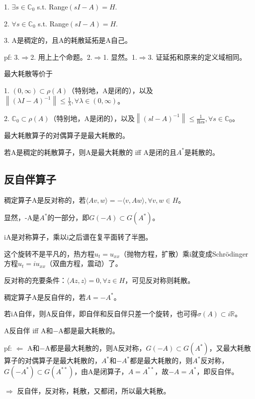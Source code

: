 1. $\exists s \in \mathbb{C}_0$ s.t. Range$(sI - A) = H$.

2. $\forall s \in \mathbb{C}_0$ s.t. Range$(sI - A) = H$.

3. A是稠定的，且A的耗散延拓是A自己。

pf: 3.$\Rightarrow$2. 用上上个命题。2.$\Rightarrow$1. 显然。1.$\Rightarrow$3. 证延拓和原来的定义域相同。

最大耗散等价于

1. $(0, \infty) \subset \rho(A)$（特别地，A是闭的），以及$\left\|(\lambda I-A)^{-1}\right\| \leq \frac{1}{\lambda}, \forall \lambda \in(0, \infty)$。

2. $\mathbb{C}_{0} \subset \rho(A)$（特别地，A是闭的），以及$\left\|(s l-A)^{-1}\right\| \leq \frac{1}{\operatorname{Res}}, \forall s \in \mathbb{C}_{0}$。

最大耗散算子的对偶算子是最大耗散的。

若A是稠定的耗散算子，则A是最大耗散的 iff A是闭的且$A^{\ast}$是耗散的。

\subsection{反自伴算子}

稠定算子A是反对称的，若$\langle Av, w \rangle = - \langle v, Aw \rangle, \forall v, w \in H$。

显然，-A是$A^{\ast}$的一部分，即$G(- A) \subset G(A^{\ast})$。

iA是对称算子，乘以i之后谱在复平面转了半圈。

这个旋转不是平凡的，热方程$u_t = u_{xx}$（抛物方程，扩散）乘i就变成Schrödinger方程$u_t = i u_{xx}$（双曲方程，震动）了。

反对称的充要条件：$\langle Az, z \rangle = 0, \forall z \in H$，可见反对称则耗散。

稠定算子A是反自伴的，若$A = -A^{\ast}$。

若iA自伴，则A反自伴，即自伴和反自伴只差一个旋转，也可得$\sigma(A) \subset i\mathbb{R}$。

A反自伴 iff A和$-$A都是最大耗散的。

pf: $\Leftarrow$ A和$-$A都是最大耗散的，则A反对称，$G(-A) \subset G(A^{\ast})$，又最大耗散算子的对偶算子是最大耗散的，$A^{\ast}$和$-A^{\ast}$都是最大耗散的，则$A^{\ast}$反对称，$G(-A^{\ast}) \subset G(A^{\ast \ast})$，由A是闭算子，$A = A^{\ast \ast}$，故$-A = A^{\ast}$，即反自伴。

$\Rightarrow$ 反自伴，反对称，耗散，又都闭，所以最大耗散。

